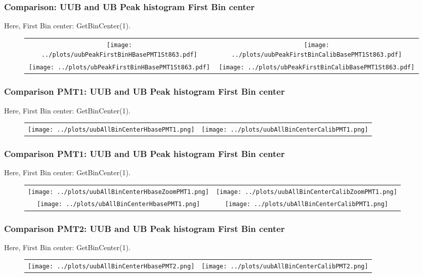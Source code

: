 \documentclass[aspectratio=169]{beamer}
\begin{document}
\begin{frame}
	\frametitle{Comparison: UUB and UB Peak histogram First Bin center}
	Here, First Bin center: GetBinCenter(1).
	
	\begin{figure}
		\centering
		\begin{tabularx}{\textwidth}{CC}
			\texttt{[image: ../plots/uubPeakFirstBinHBasePMT1St863.pdf]}
			&
			\texttt{[image: ../plots/uubPeakFirstBinCalibBasePMT1St863.pdf]}
			\\
			\texttt{[image: ../plots/ubPeakFirstBinHBasePMT1St863.pdf]}
			&
			\texttt{[image: ../plots/ubPeakFirstBinCalibBasePMT1St863.pdf]}
		\end{tabularx}
	\end{figure}
\end{frame}


\begin{frame}
	\frametitle{Comparison PMT1: UUB and UB Peak histogram First Bin center}
	Here, First Bin center: GetBinCenter(1).
	\begin{figure}
		\centering
		\begin{tabularx}{\textwidth}{CC}
			\texttt{[image: ../plots/uubAllBinCenterHbasePMT1.png]}
			&
			\texttt{[image: ../plots/uubAllBinCenterCalibPMT1.png]}
    \end{tabularx}
  \end{figure}
\end{frame}


\begin{frame}
  \frametitle{Comparison PMT1: UUB and UB Peak histogram First Bin center}
  Here, First Bin center: GetBinCenter(1).
  \begin{figure}
    \centering
    \begin{tabularx}{\textwidth}{CC}
			\texttt{[image: ../plots/uubAllBinCenterHbaseZoomPMT1.png]}
			&
			\texttt{[image: ../plots/uubAllBinCenterCalibZoomPMT1.png]}
      \\
			\texttt{[image: ../plots/ubAllBinCenterHbasePMT1.png]}
			&
			\texttt{[image: ../plots/ubAllBinCenterCalibPMT1.png]}
		\end{tabularx}
	\end{figure}
\end{frame}


\begin{frame}
	\frametitle{Comparison PMT2: UUB and UB Peak histogram First Bin center}
	Here, First Bin center: GetBinCenter(1).
	\begin{figure}
		\centering
		\begin{tabularx}{\textwidth}{CC}
			\texttt{[image: ../plots/uubAllBinCenterHbasePMT2.png]}
			&
			\texttt{[image: ../plots/uubAllBinCenterCalibPMT2.png]}
    \end{tabularx}
  \end{figure}
\end{frame}
\end{document}
